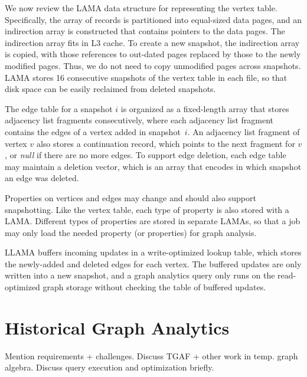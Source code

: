 \documentclass{svjour3}
\begin{document}
We now review the LAMA data structure for representing the vertex table. Specifically, the array of records is partitioned into equal-sized data pages, and an indirection array is constructed that contains pointers to the data pages. The indirection array fits in L3 cache. To create a new snapshot, the indirection array is copied, with those references to out-dated pages replaced by those to the newly modified pages. Thus, we do not need to copy unmodified pages across snapshots. LAMA stores 16 consecutive snapshots of the vertex table in each file, so that disk space can be easily reclaimed from deleted snapshots.

The edge table for a snapshot $i$ is organized as a fixed-length array that stores adjacency list fragments consecutively, where each adjacency list fragment contains the edges of a vertex added in snapshot~$i$. An adjacency list fragment of vertex $v$ also stores a continuation record, which points to the next fragment for $v$, or {\em null} if there are no more edges. To support edge deletion, each edge table may maintain a deletion vector, which is an array that encodes in which snapshot an edge was deleted.

Properties on vertices and edges may change and should also support snapshotting. Like the vertex table, each type of property is also stored with a LAMA. Different types of properties are stored in separate LAMAs, so that a job may only load the needed property (or properties) for graph analysis.

LLAMA buffers incoming updates in a write-optimized lookup table, which stores the newly-added and deleted edges for each vertex. The buffered updates are only written into a new snapshot, and a graph analytics query only runs on the read-optimized graph storage without checking the table of buffered updates.



\section{Historical Graph Analytics}
Mention requirements + challenges.
Discuss TGAF + other work in temp. graph algebra. Discuss query execution and optimization briefly. 

~\cite{khurana2013efficient}~\cite{macko2015llama}~\cite{han2014chronos}~\cite{khurana2016storing}






\end{document}
